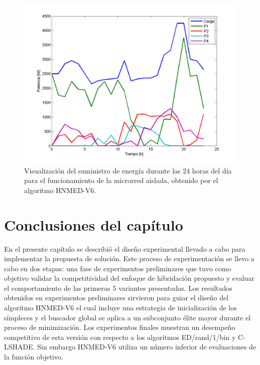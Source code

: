 \begin{figure}
	\centering

		\includegraphics[width=\textwidth]{Figures/SCE1}


	\caption{Visualización del suministro de energía durante las 24 horas del día para el funcionamiento de la microrred aislada, obtenido por el algoritmo HNMED-V6.} \label{Visualización del suministro de energía durante las 24 horas del día para el funcionamiento de la microrred aislada, obtenido por el algoritmo HNMED-V6.}
\end{figure}


\section{Conclusiones del capítulo}
En el presente capítulo se describió el diseño experimental llevado a cabo para implementar la propuesta de solución. Este proceso de experimentación se llevo a cabo en dos etapas: una fase de experimentos preliminares que tuvo como objetivo validar la competitividad del enfoque de hibridación propuesto y evaluar el comportamiento de las primeras 5 variantes presentadas. Los resultados obtenidos en experimentos preliminares sirvieron para guiar el diseño del algoritmo HNMED-V6 el cual incluye una estrategia de inicialización de los símpleces y el buscador global se aplica a un subconjunto élite mayor durante el proceso de minimización. Los experimentos finales muestran un desempeño competitivo de esta versión con respecto a los algoritmos ED/rand/1/bin y C-LSHADE. Sin embargo HNMED-V6 utiliza un número inferior de evaluaciones de la función objetivo.